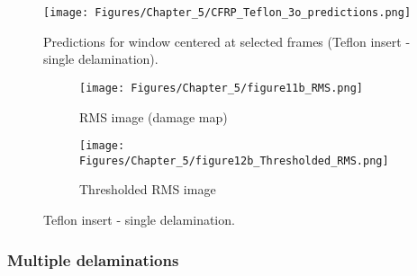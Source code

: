 \begin{figure}[!h]
	\centering
	\texttt{[image: Figures/Chapter\_5/CFRP\_Teflon\_3o\_predictions.png]}
	\caption{Predictions for window centered at selected frames (Teflon insert - single delamination).}
	\label{fig:CFRP_Teflon_3o_predictions}
\end{figure}
\begin{figure} [!h]
	\begin{subfigure}[b]{.5\textwidth}
		\centering
		\texttt{[image: Figures/Chapter\_5/figure11b\_RMS.png]}
		\caption{RMS image (damage map)}
		\label{fig:RMS_CFRP_Teflon_3o_saeed}
	\end{subfigure}
	\hfill
	\begin{subfigure}[b]{.42\textwidth}
		\centering
		\texttt{[image: Figures/Chapter\_5/figure12b\_Thresholded\_RMS.png]}
		\caption{Thresholded RMS image} 
		\label{fig:RMS_CFRP_Teflon_3o_ijjeh}
	\end{subfigure}
	\caption{Teflon insert - single delamination.}
	\label{fig:RMS_CFRP_Teflon_3o_images}
\end{figure} 
\clearpage
\subsubsection{Multiple delaminations}
\label{sec5322}

